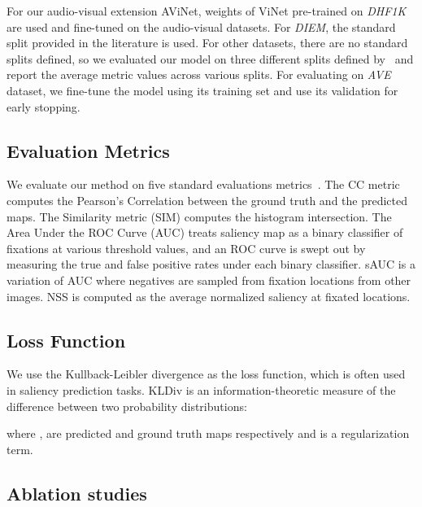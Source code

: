 \documentclass[letterpaper, 10 pt, conference]{ieeeconf}  \usepackage{times}
\begin{document}
For our audio-visual extension AViNet, weights of ViNet pre-trained on \emph{DHF1K} are used and fine-tuned on the audio-visual datasets. For \emph{DIEM}, the standard split provided in the literature is used. For other datasets, there are no standard splits defined, so we evaluated our model on three different splits defined by~\cite{tsiami2020stavis} and report the average metric values across various splits. For evaluating on \emph{AVE} dataset, we fine-tune the model using its training set and use its validation for early stopping.



\subsection{Evaluation Metrics}
 We evaluate our method on five standard evaluations metrics~\cite{bylinskii2018different}. The CC metric computes the Pearson’s Correlation between the ground truth and the predicted maps. The Similarity metric (SIM) computes the histogram intersection. The Area Under the ROC Curve (AUC) treats saliency map as a binary classifier of fixations at various threshold values, and an ROC curve is swept out by measuring the true and false positive rates under each binary classifier. sAUC is a variation of AUC where negatives are sampled from fixation locations from other images. NSS is computed as the average normalized saliency at fixated locations.


\subsection{Loss Function}
We use the Kullback-Leibler divergence as the loss function, which is often used in saliency prediction tasks. KLDiv is an information-theoretic measure of the difference between two probability distributions:

where ,  are predicted and ground truth maps respectively and  is a regularization term. 

\subsection{Ablation studies}
\end{document}
